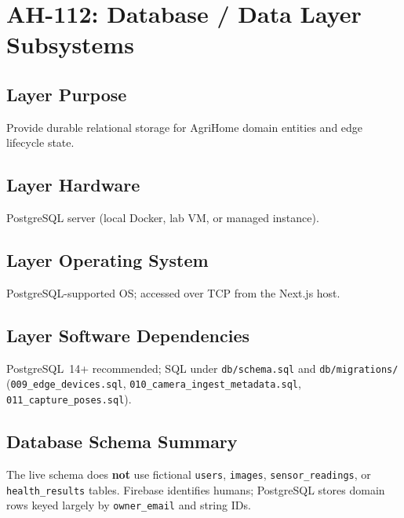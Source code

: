 \documentclass[11pt,letterpaper]{article}
\begin{document}
\section{AH-112: Database / Data Layer Subsystems}

\subsection{Layer Purpose}
Provide durable relational storage for AgriHome domain entities and edge lifecycle state.

\subsection{Layer Hardware}
PostgreSQL server (local Docker, lab VM, or managed instance).

\subsection{Layer Operating System}
PostgreSQL-supported OS; accessed over TCP from the Next.js host.

\subsection{Layer Software Dependencies}
PostgreSQL~14+ recommended; SQL under \texttt{db/schema.sql} and
\texttt{db/migrations/} (\texttt{009\_edge\_devices.sql},
\texttt{010\_camera\_ingest\_metadata.sql}, \texttt{011\_capture\_poses.sql}).

\subsection{Database Schema Summary}
The live schema does \textbf{not} use fictional \texttt{users}, \texttt{images},
\texttt{sensor\_readings}, or \texttt{health\_results} tables. Firebase identifies humans;
PostgreSQL stores domain rows keyed largely by \texttt{owner\_email} and string IDs.
\end{document}
